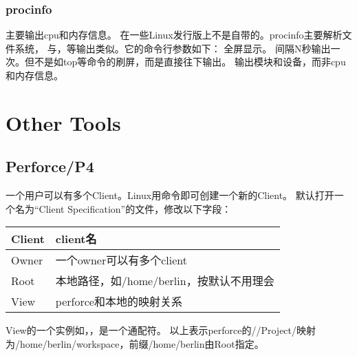 \subsection{procinfo}
主要输出cpu和内存信息。
在一些Linux发行版上不是自带的。procinfo主要解析文件系统，
与，等输出类似。它的命令行参数如下：
 全屏显示。
 间隔N秒输出一次。但不是如top等命令的刷屏，而是直接往下输出。
 输出模块和设备，而非cpu和内存信息。





\chapter{Other Tools}

\section{Perforce/P4}
一个用户可以有多个Client。Linux用命令即可创建一个新的Client。
默认打开一个名为``Client Specification''的文件，修改以下字段：

\begin{tabular}{|l|l|}\hline
Client      & client名  \\\hline
Owner       & 一个owner可以有多个client \\\hline
Root        & 本地路径，如/home/berlin，按默认不用理会  \\\hline
View        & perforce和本地的映射关系  \\\hline
\end{tabular}

View的一个实例如，，是一个通配符。
以上表示perforce的//Project/映射为/home/berlin/workspace，前缀/home/berlin由Root指定。

